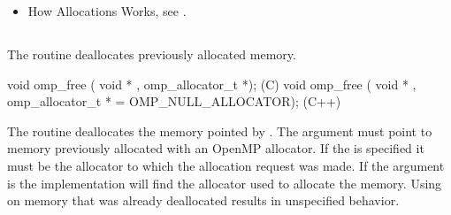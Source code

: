 \crossreferences
\begin{itemize}
\item How Allocations Works, see .
\end{itemize}

\subsection{}
\label{subsec:omp_free}

\summary
The  routine deallocates previously allocated memory. 

\format

\begin{boxedcode}
void omp_free ( void * , omp\_allocator\_t *);        (C)
void omp_free ( void * , 
             omp\_allocator\_t * = OMP_NULL_ALLOCATOR); (C++)
\end{boxedcode}

\effect

The  routine deallocates the memory pointed by . The  argument must point to memory previously allocated with an OpenMP allocator. If the  is specified it must be the allocator to which the allocation request was made. If the  argument is  the implementation will find the allocator used to allocate the memory. Using  on memory that was already deallocated results in unspecified behavior.

\ccppspecificend
